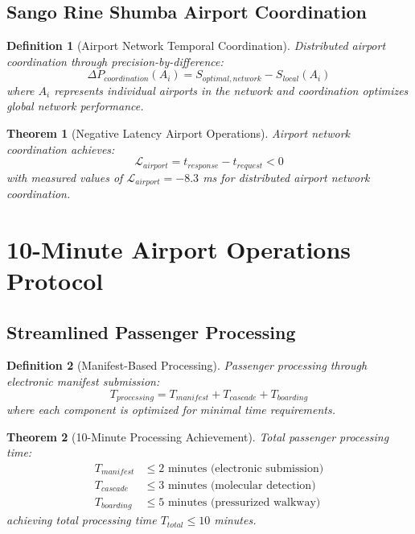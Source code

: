 \documentclass[12pt,a4paper]{article}
\newtheorem{theorem}{Theorem}
\newtheorem{definition}{Definition}
\begin{document}
\subsection{Sango Rine Shumba Airport Coordination}

\begin{definition}[Airport Network Temporal Coordination]
Distributed airport coordination through precision-by-difference:
\begin{equation}
\Delta P_{coordination}(A_i) = S_{optimal,network} - S_{local}(A_i)
\end{equation}
where $A_i$ represents individual airports in the network and coordination optimizes global network performance.
\end{definition}

\begin{theorem}[Negative Latency Airport Operations]
Airport network coordination achieves:
\begin{equation}
\mathcal{L}_{airport} = t_{response} - t_{request} < 0
\end{equation}
with measured values of $\mathcal{L}_{airport} = -8.3$ ms for distributed airport network coordination.
\end{theorem}

\section{10-Minute Airport Operations Protocol}

\subsection{Streamlined Passenger Processing}

\begin{definition}[Manifest-Based Processing]
Passenger processing through electronic manifest submission:
\begin{equation}
T_{processing} = T_{manifest} + T_{cascade} + T_{boarding}
\end{equation}
where each component is optimized for minimal time requirements.
\end{definition}

\begin{theorem}[10-Minute Processing Achievement]
Total passenger processing time:
\begin{align}
T_{manifest} &\leq 2 \text{ minutes (electronic submission)} \\
T_{cascade} &\leq 3 \text{ minutes (molecular detection)} \\
T_{boarding} &\leq 5 \text{ minutes (pressurized walkway)}
\end{align}
achieving total processing time $T_{total} \leq 10$ minutes.
\end{theorem}
\end{document}
